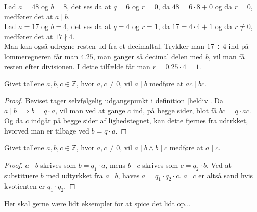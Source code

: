     \begin{eks}
        Lad \(a = 48\) og \(b = 8\), det ses da at \(q = 6\) og \(r = 0\), da \(48 = 6 \cdot 8 + 0\) og da \(r = 0\), medfører det at \(a \mid b\).\\

        Lad \(a = 17\) og \(b = 4\), det ses da at \(q = 4\) og \(r = 1\), da \(17 = 4 \cdot 4 + 1\) og da \(r \neq 0\), medfører det at \(17 \nmid 4\).\\

        Man kan også udregne resten ud fra et decimaltal.
        Trykker man \(17 \div 4\) ind på lommeregneren får man \(4.25\), man ganger så decimal delen med \(b\), vil man få resten efter divisionen.
        I dette tilfælde får man \(r = 0.25 \cdot 4 = 1\).
    \end{eks}




    \begin{sent}
        Givet tallene \(a, b, c \in \mathbb{Z}\), hvor \(a, c \neq 0\), vil \(a \mid b\) medføre at \(a c \mid b c\).
    \end{sent}

    \begin{proof}
        Beviset tager selvfølgelig udgangspunkt i definition \ref{heldiv}.
        Da \(a \mid b \implies b = q \cdot a\), vil man ved at gange \(c\) ind, på begge sider, blot få \(b c = q \cdot a c\).
        Og da \(c\) indgår på begge sider af lighedstegnet, kan dette fjernes fra udtrkket, hvorved man er tilbage ved \(b = q \cdot a\).
    \end{proof}





    \begin{sent}
        Givet tallene \(a, b, c \in \mathbb{Z}\), hvor \(a, c \neq 0\), vil \(a \mid b \land b \mid c\) medføre at \(a \mid c\).
    \end{sent}

    \begin{proof}
        \(a \mid b\) skrives som \(b = q_1 \cdot a\), mens \(b \mid c\) skrives som \(c = q_2 \cdot b\). Ved at substituere \(b\) med udtyrkket fra \(a \mid b\), haves \(a = q_1 \cdot q_2 \cdot c\). \(a \mid c\) er altså sand hvis kvotienten er \(q_1 \cdot q_2\).
    \end{proof}


    \begin{eks}
        Her skal gerne være lidt eksempler for at spice det lidt op...
    \end{eks}



